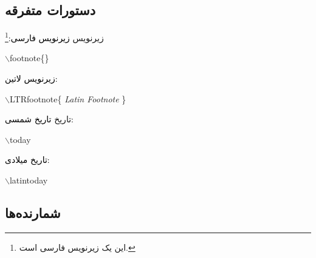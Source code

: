 \subsection{دستورات متفرقه}
\begin{plainslide}
\begin{block}{زیرنویس}
\textcolor{black}{زیرنویس فارسی:}\footnote{این یک زیرنویس فارسی است.}
\begin{latin}
$\backslash$footnote\{\}\\
\end{latin}
\textcolor{black}{زیرنویس لاتین:}
\begin{latin}
$\backslash$LTRfootnote\{ {\it Latin Footnote} \}\\
\end{latin}
\end{block}
\end{plainslide}
%
\begin{plainslide}
\begin{block}{تاریخ}
\textcolor{black}{تاریخ شمسی:}
\begin{latin}
$\backslash$today\\
\rl{\today}
\end{latin}

\textcolor{black}{تاریخ میلادی:}
\begin{latin}
$\backslash$latintoday\\
\latintoday
\end{latin}
\end{block}

\end{plainslide}


\subsection{شمارنده‌ها}

